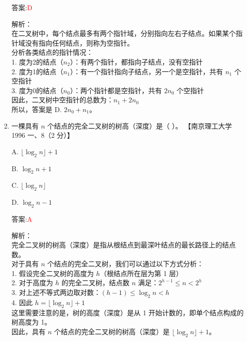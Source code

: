 \documentclass[lang=cn,newtx,10pt,scheme=chinese]{../../../elegantbook}
\begin{document}
\begin{enumerate}
    答案:\textcolor{red}{D}
    
    解析：\\
    在二叉树中，每个结点最多有两个指针域，分别指向左右子结点。如果某个指针域没有指向任何结点，则称为空指针。\\
    
    分析各类结点的指针情况：\\
    1. 度为2的结点（$n_2$）：有两个指针，都指向子结点，没有空指针\\
    2. 度为1的结点（$n_1$）：有一个指针指向子结点，另一个是空指针，共有 $n_1$ 个空指针\\
    3. 度为0的结点（$n_0$）：两个指针都是空指针，共有 $2n_0$ 个空指针\\
    
    因此，二叉树中空指针的总数为：$n_1 + 2n_0$\\
    
    所以，答案是 D. $2n_0 + n_1$。\\


    \item 一棵具有 $n$ 个结点的完全二叉树的树高（深度）是（ ）。  
    【南京理工大学 1996 一、8（2 分）】  

    A. $\lfloor \log_2 n \rfloor + 1$  

    B. $ \log_2 n  + 1$ 

    C. $ \lfloor \log_2 n \rfloor$  

    D. $\log_2 n - 1$  

    答案:\textcolor{red}{A}
    
    解析：\\
    完全二叉树的树高（深度）是指从根结点到最深叶结点的最长路径上的结点数。\\
    
    对于具有 $n$ 个结点的完全二叉树，我们可以通过以下方式分析：\\
    1. 假设完全二叉树的高度为 $h$（根结点所在层为第 1 层）\\
    2. 对于高度为 $h$ 的完全二叉树，结点数 $n$ 满足：$2^{h-1} \leq n < 2^h$\\
    3. 对上述不等式两边取对数：$(h-1) \leq \log_2 n < h$\\
    4. 因此 $h = \lfloor \log_2 n \rfloor + 1$\\
    
    这里需要注意的是，树的高度（深度）是从 1 开始计数的，即单个结点构成的树高度为 1。\\
    
    因此，具有 $n$ 个结点的完全二叉树的树高（深度）是 $\lfloor \log_2 n \rfloor + 1$。\\


\end{enumerate}
\end{document}

